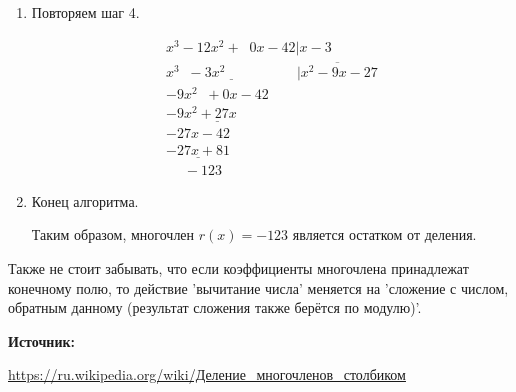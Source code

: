 \documentclass[12pt,a4paper]{scrartcl}
\begin{document}
\begin{enumerate}
	\item Повторяем шаг 4.
	
	$$\begin{matrix}x^{3}-12x^{2}+\;\;0x-42\vert x-3\qquad \quad \;\\{\underline {x^{3}\;\;-3x^{2}\qquad \qquad \;\;\;\;}}{\overline {\vert x^{2}-9x-27}}\\-9x^{2}\;\;+0x-42\qquad \quad \;\;\;\\{\underline {-9x^{2}+27x\qquad \;}}\qquad \quad \;\;\;\\-27x-42\quad \\{\underline {-27x+81}}\quad \\\quad \;-123\end{matrix}$$
	
	\item Конец алгоритма.
	
	Таким образом, многочлен $r(x) = - 123$ является остатком от деления. 
	
\end{enumerate}

Также не стоит забывать, что если коэффициенты многочлена принадлежат конечному полю, то действие 'вычитание числа' меняется на 'сложение с числом, обратным данному (результат сложения также берётся по модулю)'.

\textbf{Источник:}

\href{https://ru.wikipedia.org/wiki/%D0%94%D0%B5%D0%BB%D0%B5%D0%BD%D0%B8%D0%B5_%D0%BC%D0%BD%D0%BE%D0%B3%D0%BE%D1%87%D0%BB%D0%B5%D0%BD%D0%BE%D0%B2_%D1%81%D1%82%D0%BE%D0%BB%D0%B1%D0%B8%D0%BA%D0%BE%D0%BC}{https://ru.wikipedia.org/wiki/Деление\_многочленов\_столбиком}
	
\end{document}
